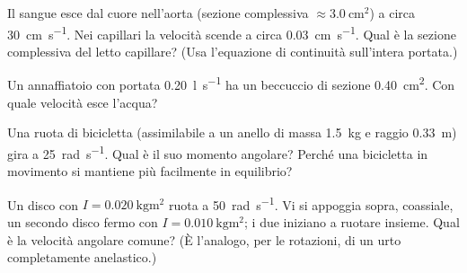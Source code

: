 \begin{esercizio}
Il sangue esce dal cuore nell'aorta (sezione complessiva $\approx \SI{3,0}{\centi\metre\squared}$) a circa \SI{30}{\centi\metre\per\second}. Nei capillari la velocità scende a circa \SI{0,03}{\centi\metre\per\second}. Qual è la sezione complessiva del letto capillare? (Usa l'equazione di continuità sull'intera portata.)\\
\end{esercizio}

\begin{esercizio}
Un annaffiatoio con portata \SI{0,20}{\litre\per\second} ha un beccuccio di sezione \SI{0,40}{\centi\metre\squared}. Con quale velocità esce l'acqua?\\
\end{esercizio}

\begin{esercizio}
Una ruota di bicicletta (assimilabile a un anello di massa \SI{1,5}{\kilogram} e raggio \SI{0,33}{\metre}) gira a \SI{25}{\radian\per\second}. Qual è il suo momento angolare? Perché una bicicletta in movimento si mantiene più facilmente in equilibrio?\\
\end{esercizio}

\begin{esercizio}
Un disco con $I = \SI{0,020}{\kilogram\metre\squared}$ ruota a \SI{50}{\radian\per\second}. Vi si appoggia sopra, coassiale, un secondo disco fermo con $I = \SI{0,010}{\kilogram\metre\squared}$; i due iniziano a ruotare insieme. Qual è la velocità angolare comune? (È l'analogo, per le rotazioni, di un urto completamente anelastico.)\\
\end{esercizio}
